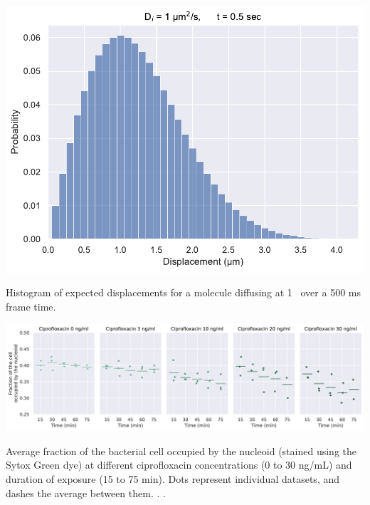 \begin{suppfigure*}[htbp]
    \begin{center}
    \includegraphics[width=.8\textwidth]{SI_Figures/Displacements_distribution.pdf}
    \end{center}
    \caption{Histogram of expected displacements for a molecule diffusing at 1 \ums\ over a 500 ms frame time.}
    \label{SIFig:displacement_simul}
\end{suppfigure*}

\begin{suppfigure*}[htbp]
    \begin{center}
    \includegraphics[width=\textwidth]{SI_Figures/Nucleoid_compaction.pdf}
    \end{center}
    \caption{Average fraction of the bacterial cell occupied by the nucleoid (stained using the Sytox Green dye) at different ciprofloxacin concentrations (0 to 30 ng/mL) and duration of exposure (15 to 75 min). Dots represent individual datasets, and dashes the average between them. . .}
    \label{SIFig:nucleoid_compaction}
\end{suppfigure*}

